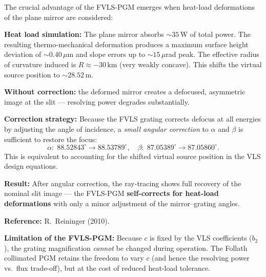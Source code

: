 \documentclass[12pt,a4paper]{article}
\newcommand{\placeholder}[4][\linewidth]{%
  \begin{figure}[H]
    \centering
    \begin{tikzpicture}
      \draw[fill=plbg, draw=plframe, line width=1pt, dashed]
            (0,0) rectangle (#1, #2);
      \draw[plframe, line width=0.4pt] (0,0) -- (#1,#2);
      \draw[plframe, line width=0.4pt] (#1,0) -- (0,#2);
      \node[anchor=north west, font=\small\bfseries\color{plframe},
            inner sep=4pt] at (0,#2) {#3};
      \node[anchor=center, font=\small\itshape\color{pltext},
            text width=0.75\linewidth, align=center]
            at ({0.5*#1},{0.5*#2}) {#4};
    \end{tikzpicture}
  \end{figure}
}
\newcommand{\al}{\alpha}
\newcommand{\be}{\beta}
\begin{document}
The crucial advantage of the FVLS-PGM emerges when heat-load deformations of the plane
mirror are considered:

\begin{exbox}
\textbf{Heat load simulation:} The plane mirror absorbs $\sim 35$\,W of total power.
The resulting thermo-mechanical deformation produces a maximum surface height deviation of
$\sim 0.40\,\mu$m and slope errors up to $\sim 15\,\mu$rad peak.  The effective radius of
curvature induced is $R \approx -30\,\mathrm{km}$ (very weakly concave).  This shifts the
virtual source position to $\sim 28.52$\,m.

\medskip
\textbf{Without correction:} the deformed mirror creates a defocused, asymmetric image at
the slit --- resolving power degrades substantially.

\medskip
\textbf{Correction strategy:} Because the FVLS grating corrects defocus at all energies
by adjusting the angle of incidence, a \emph{small angular correction} to $\al$ and $\be$
is sufficient to restore the focus:
\[
  \al:\; 88.52843^\circ \to 88.53789^\circ,\quad
  \be:\; 87.05389^\circ \to 87.05860^\circ.
\]
This is equivalent to accounting for the shifted virtual source position in the VLS design
equations.

\medskip
\textbf{Result:} After angular correction, the ray-tracing shows full recovery of the
nominal slit image --- the FVLS-PGM \textbf{self-corrects for heat-load deformations}
with only a minor adjustment of the mirror--grating angles.

\medskip
\textbf{Reference:} R.\ Reininger (2010).
\end{exbox}



\begin{notebox}
\textbf{Limitation of the FVLS-PGM:} Because $c$ is fixed by the VLS coefficients
($b_2$), the grating magnification \emph{cannot} be changed during operation.  The Follath
collimated PGM retains the freedom to vary $c$ (and hence the resolving power vs.\ flux
trade-off), but at the cost of reduced heat-load tolerance.
\end{notebox}
\end{document}
